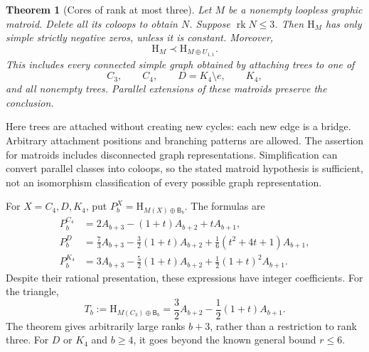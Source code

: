 \documentclass[12pt]{amsart}
\newtheorem{thm}{Theorem}[section]
\theoremstyle{definition}
\theoremstyle{remark}
\numberwithin{equation}{section}
\newcommand{\rk}{\operatorname{rk}}
\newcommand{\HCh}{\mathrm{H}}
\newcommand{\Bmat}{\mathsf{B}}
\begin{document}
\begin{samepage}
\begin{thm}[Cores of rank at most three]\label{en-main}
Let $M$ be a nonempty loopless graphic matroid. Delete all its coloops to obtain $N$. Suppose $\rk N\leq3$. Then $\HCh_M$ has only simple strictly negative zeros, unless it is constant. Moreover,
\[
 \HCh_M\prec \HCh_{M\oplus U_{1,1}}.
\]
This includes every connected simple graph obtained by attaching trees to one of
\[
 C_3,\qquad C_4,\qquad D=K_4\setminus e,\qquad K_4,
\]
and all nonempty trees. Parallel extensions of these matroids preserve the conclusion.
\end{thm}
\end{samepage}

Here trees are attached without creating new cycles: each new edge is a bridge. Arbitrary attachment positions and branching patterns are allowed. The assertion for matroids includes disconnected graph representations. Simplification can convert parallel classes into coloops, so the stated matroid hypothesis is sufficient, not an isomorphism classification of every possible graph representation.

For $X=C_4,D,K_4$, put $P_b^X=\HCh_{M(X)\oplus\Bmat_b}$. The formulas are
\begin{align}
 P_b^{C_4}&=2A_{b+3}-(1+t)A_{b+2}+tA_{b+1},\label{en-c4}\\
 P_b^D&=\frac73A_{b+3}-\frac32(1+t)A_{b+2}
       +\frac16(t^2+4t+1)A_{b+1},\label{en-diamond}\\
 P_b^{K_4}&=3A_{b+3}-\frac52(1+t)A_{b+2}
       +\frac12(1+t)^2A_{b+1}.\label{en-k4}
\end{align}
Despite their rational presentation, these expressions have integer coefficients. For the triangle,
\begin{equation}\label{en-triangle}
 T_b:=\HCh_{M(C_3)\oplus\Bmat_b}
 =\frac32A_{b+2}-\frac12(1+t)A_{b+1}.
\end{equation}
The theorem gives arbitrarily large ranks $b+3$, rather than a restriction to rank three. For $D$ or $K_4$ and $b\geq4$, it goes beyond the known general bound $r\leq6$.
\end{document}
